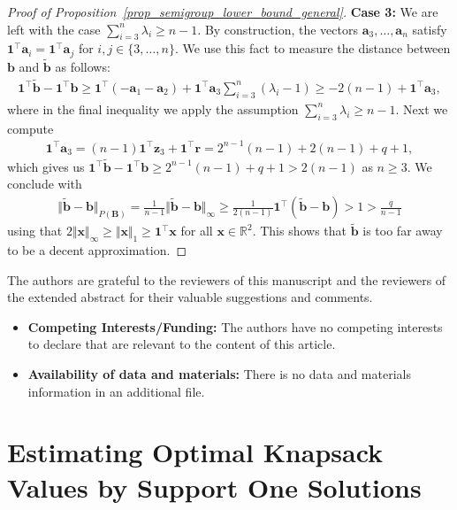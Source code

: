 \documentclass[pdflatex]{sn-jnl}
\newcommand{\R}{\mathbb{R}}
\newcommand{\bx}{\bm{x}}
\newcommand{\bb}{\bm{b}}
\newcommand{\ba}{\bm{a}}
\newcommand{\bz}{\bm{z}}
\newcommand{\br}{\bm{r}}
\newcommand{\bB}{\bm{B}}
\theoremstyle{thmstyleone}%
\theoremstyle{thmstyletwo}%
\theoremstyle{thmstylethree}%
\begin{document}
\begin{proof}[Proof of Proposition~\ref{prop_semigroup_lower_bound_general}]
		\textbf{Case 3:} We are left with the case $\sum_{i=3}^n\lambda_i \geq n-1$. By construction, the vectors $\ba_3,\ldots,\ba_n$ satisfy $\bm{1}^\top\ba_i = \bm{1}^\top \ba_j$ for $i,j\in\lbrace 3,\ldots,n\rbrace$. We use this fact to measure the distance between $\bb$ and $\tilde{\bb}$ as follows:
		\begin{align*}
			\bm{1}^\top\tilde{\bb} - \bm{1}^\top\bb \geq \bm{1}^\top (-\ba_1-\ba_2) + \bm{1}^\top\ba_3 \sum_{i=3}^n (\lambda_i - 1)\geq -2(n-1) + \bm{1}^\top\ba_3,
		\end{align*}
		where in the final inequality we apply the assumption $\sum_{i=3}^{n}\lambda_i\geq n-1$. Next we compute
		\begin{align*}
			\bm{1}^\top\ba_3 = (n-1)\bm{1}^\top\bz_3 + \bm{1}^\top\br =  2^{n-1}(n-1) + 2(n-1) + q + 1,
		\end{align*}
		which gives us $\bm{1}^\top\tilde{\bb} - \bm{1}^\top\bb\geq 2^{n-1}(n-1) + q + 1 > 2(n-1)$ as $n\geq 3$. We conclude with
		\begin{align*}
			\Vert \tilde{\bb} - \bb\Vert_{P(\bB)} = \frac{1}{n-1}\Vert \tilde{\bb} - \bb\Vert_\infty \geq \frac{1}{2(n-1)} \bm{1}^\top(\tilde{\bb} - \bb) > 1 > \frac{q}{n-1}
		\end{align*}
		using that $2\Vert \bx\Vert_\infty\geq\Vert\bx\Vert_1\geq \bm{1}^\top\bx$ for all $\bx\in\R^2$. 
		This shows that $\tilde{\bb}$ is too far away to be a decent approximation.
	\end{proof}	
	
	 The authors are grateful to the reviewers of this manuscript and the reviewers of the extended abstract for their valuable suggestions and comments.
	
	\begin{itemize}
		\item \textbf{Competing Interests/Funding:} The authors have no competing interests to declare that are relevant to the content of this article.
		\item \textbf{Availability of data and materials:} There is no data and materials information in an additional file.
	\end{itemize}
	
	
	
	
	
	\appendix
	\section{Estimating Optimal Knapsack Values by Support One Solutions}
	
\end{document}
